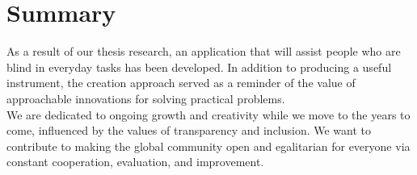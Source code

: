 \documentclass[MScCS]{uccthesis}
\begin{document}
\section{Summary}

As a result of our thesis research, an application that will assist people who are blind in everyday tasks has been developed. In addition to producing a useful instrument, the creation approach served as a reminder of the value of approachable innovations for solving practical problems.
\\We are dedicated to ongoing growth and creativity while we move to the years to come, influenced by the values of transparency and inclusion. We want to contribute to making the global community open and egalitarian for everyone via constant cooperation, evaluation, and improvement.





\
%
%
\backmatter
%
%
   \printbibliography
\end{document}
